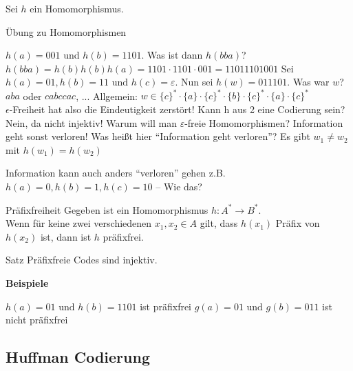 \documentclass{beamer}
\begin{document}
\begin{frame}
	Sei $h$ ein Homomorphismus.
	
	\begin{taskblock}{Übung zu Homomorphismen}
			\begin{enumerate}
				\pitem $h(a) = 001$ und $h(b) = 1101$. Was ist dann $h(bba)$? 
				\pitem[$\rightarrow$] $h(bba) = h(b)h(b)h(a) = 1101 \cdot 1101 \cdot 001 = 11011101001$
				\pitem Sei $h(a) = 01, h(b) = 11 \text{ und } h(c) = \varepsilon$. Nun sei $h(w)= 011101$. Was war $w$? 
				\pitem[$\rightarrow$] $aba$ oder $cabccac$, ... Allgemein: $w \in \{c\}^* \cdot \{a\} \cdot \{c\}^* \cdot \{b\} \cdot \{c\}^* \cdot \{a\} \cdot \{c\}^*$ \\ \p $\epsilon$-Freiheit hat also die Eindeutigkeit zerstört!
				\pitem Kann h aus 2 eine Codierung sein?
				\pitem[$\rightarrow$] Nein, da nicht injektiv!
				\pitem Warum will man $\varepsilon$-freie Homomorphismen?
				\pitem[$\rightarrow$] Information geht sonst verloren!
				\pitem Was heißt hier ``Information geht verloren''? 
				\pitem[$\rightarrow$] Es gibt $w_1 \neq w_2$ mit $h(w_1) = h(w_2)$
			\end{enumerate}
	\end{taskblock}
\end{frame}

\begin{frame}
	\begin{itemize}
		\pitem Information kann auch anders ``verloren'' gehen
		\pitem[$\rightarrow$] z.B. $h(a) = 0, h(b) = 1, h(c) = 10$ \p -- Wie das?
	\end{itemize} \pause
	\begin{block}{Präfixfreiheit}
		\p Gegeben ist ein Homomorphismus $h: A^* \rightarrow B^*$.\\
		\p Wenn für keine zwei verschiedenen $x_1, x_2 \in A$ gilt\p , dass $h(x_1)$  Präfix von $h(x_2)$ ist\p , dann ist $h$ präfixfrei. 
	\end{block}
	\pause
	\begin{block}{Satz}
		Präfixfreie Codes sind injektiv.
	\end{block} \pause
	\textbf{Beispiele}\\
	\begin{itemize}
		\pitem $h(a) = 01 \text{ und } h(b) = 1101 $ ist präfixfrei
		\pitem $g(a) = 01 \text{ und } g(b) = 011$ ist nicht präfixfrei
	\end{itemize}
\end{frame}

\subsection{Huffman Codierung}
\end{document}
